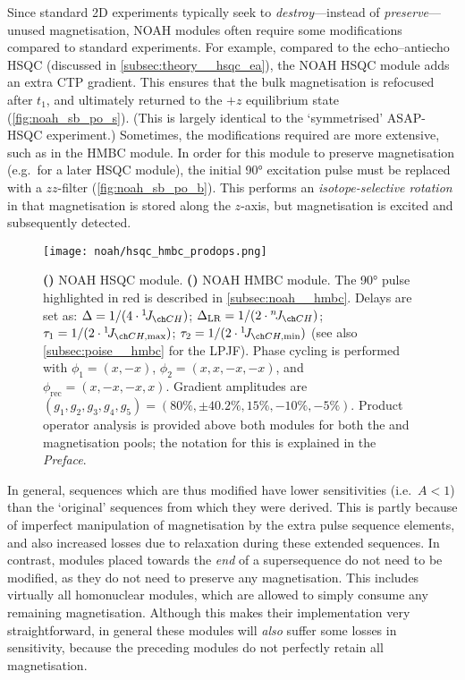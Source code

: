 Since standard 2D experiments typically seek to \textit{destroy}---instead of \textit{preserve}---unused magnetisation, NOAH modules often require some modifications compared to standard experiments.
For example, compared to the echo--antiecho HSQC (discussed in \cref{subsec:theory__hsqc_ea}), the NOAH HSQC module\autocite{Kupce2017ACIE} adds an extra CTP gradient.
This ensures that the bulk magnetisation is refocused after $t_1$, and ultimately returned to the $+z$ equilibrium state (\cref{fig:noah_sb_po_s}).
(This is largely identical to the `symmetrised' ASAP-HSQC experiment\autocite{SchulzeSunninghausen2017JMR}.)
Sometimes, the modifications required are more extensive, such as in the HMBC module.
In order for this module to preserve  magnetisation (e.g.\ for a later HSQC module), the initial \ang{90} excitation pulse must be replaced with a $zz$-filter (\cref{fig:noah_sb_po_b}).
This performs an \textit{isotope-selective rotation} in that  magnetisation is stored along the $z$-axis, but  magnetisation is excited and subsequently detected.

\begin{figure}[htb]
    \centering
    \texttt{[image: noah/hsqc\_hmbc\_prodops.png]}%
    {\label{fig:noah_sb_po_s}}%
    {\label{fig:noah_sb_po_b}}%
    \caption[NOAH HSQC and HMBC modules with product operator analysis]{
        \textbf{()} 
        NOAH HSQC module.
        \textbf{()} 
        NOAH HMBC module.
        The \ang{90} pulse highlighted in red is described in \cref{subsec:noah__hmbc}.
        Delays are set as: $\Delta = 1 / (4 \cdot \oneJ{CH})$; $\Delta_\text{LR} = 1 / (2 \cdot \nJ{CH})$; $\tau_1 = 1 / (2 \cdot \oneJ{CH,\text{max}})$; $\tau_2 = 1 / (2 \cdot \oneJ{CH,\text{min}})$ (see also \cref{subsec:poise__hmbc} for the LPJF).
        Phase cycling is performed with $\phi_1 = (x, -x)$, $\phi_2 = (x, x, -x, -x)$, and $\phi_\text{rec} = (x, -x, -x, x)$.
        Gradient amplitudes are $(g_1, g_2, g_3, g_4, g_5) = (80\%, \pm 40.2\%, 15\%, -10\%, -5\%)$.
        Product operator analysis is provided above both modules for both the  and  magnetisation pools; the notation for this is explained in the \textit{Preface}.
    }
    \label{fig:noah_sb_po}
\end{figure}

In general, sequences which are thus modified have lower sensitivities (i.e.\ $A < 1$) than the `original' sequences from which they were derived.
This is partly because of imperfect manipulation of magnetisation by the extra pulse sequence elements, and also increased losses due to relaxation during these extended sequences.
In contrast, modules placed towards the \textit{end} of a supersequence do not need to be modified, as they do not need to preserve any magnetisation.
This includes virtually all homonuclear modules, which are allowed to simply consume any remaining magnetisation.
Although this makes their implementation very straightforward, in general these modules will \textit{also} suffer some losses in sensitivity, because the preceding modules do not perfectly retain all magnetisation.

